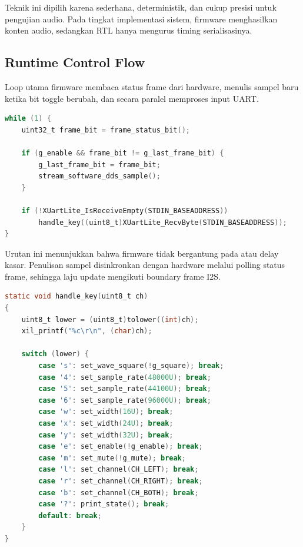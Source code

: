 Teknik ini dipilih karena sederhana, deterministik, dan cukup presisi untuk pengujian audio. Pada tingkat implementasi sistem, firmware menghasilkan konten audio, sedangkan RTL hanya mengurus timing serialisasinya.

\subsection{Runtime Control Flow}

Loop utama firmware membaca status frame dari hardware, menulis sampel baru ketika bit toggle berubah, dan secara paralel memproses input UART.

\begin{lstlisting}[language=C,caption={Alur runtime utama firmware.},label={lst:ch4-main-loop}]
while (1) {
    uint32_t frame_bit = frame_status_bit();

    if (g_enable && frame_bit != g_last_frame_bit) {
        g_last_frame_bit = frame_bit;
        stream_software_dds_sample();
    }

    if (!XUartLite_IsReceiveEmpty(STDIN_BASEADDRESS))
        handle_key((uint8_t)XUartLite_RecvByte(STDIN_BASEADDRESS));
}
\end{lstlisting}

Urutan ini menunjukkan bahwa firmware tidak bergantung pada  atau delay kasar. Penulisan sampel disinkronkan dengan hardware melalui polling status frame, sehingga laju update mengikuti boundary frame I2S.

\begin{lstlisting}[language=C,caption={Handler UART untuk kontrol runtime.},label={lst:ch4-handle-key}]
static void handle_key(uint8_t ch)
{
    uint8_t lower = (uint8_t)tolower((int)ch);
    xil_printf("%c\r\n", (char)ch);

    switch (lower) {
        case 's': set_wave_square(!g_square); break;
        case '4': set_sample_rate(48000U); break;
        case '5': set_sample_rate(44100U); break;
        case '6': set_sample_rate(96000U); break;
        case 'w': set_width(16U); break;
        case 'x': set_width(24U); break;
        case 'y': set_width(32U); break;
        case 'e': set_enable(!g_enable); break;
        case 'm': set_mute(!g_mute); break;
        case 'l': set_channel(CH_LEFT); break;
        case 'r': set_channel(CH_RIGHT); break;
        case 'b': set_channel(CH_BOTH); break;
        case '?': print_state(); break;
        default: break;
    }
}
\end{lstlisting}

